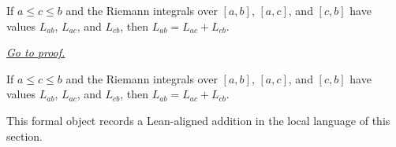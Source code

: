 \begin{dependencies}
\NoLocalDependencies
\end{dependencies}
\begin{theorem}
\label{thm:riemann-integral-interval-additivity-value}
If $a\le c\le b$ and the Riemann integrals over $[a,b]$, $[a,c]$, and $[c,b]$ have values $L_{ab}$, $L_{ac}$, and $L_{cb}$, then $L_{ab}=L_{ac}+L_{cb}$.

\smallskip
\noindent
\hyperref[prf:riemann-integral-interval-additivity-value]{\textit{Go to proof.}}
\end{theorem}

\begin{remark*}
If $a\le c\le b$ and the Riemann integrals over $[a,b]$, $[a,c]$, and $[c,b]$ have values $L_{ab}$, $L_{ac}$, and $L_{cb}$, then $L_{ab}=L_{ac}+L_{cb}$.
\end{remark*}

\begin{remark*}[Interpretation]
This formal object records a Lean-aligned addition in the local language of this section.
\end{remark*}

\begin{dependencies}
\NoLocalDependencies
\end{dependencies}
